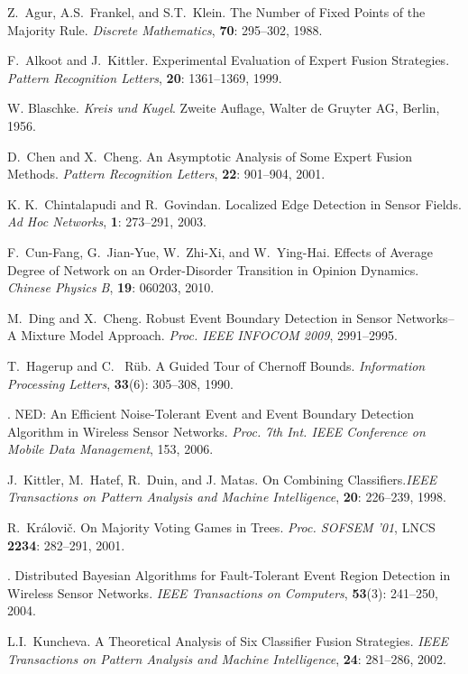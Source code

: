 \documentclass{article}
\begin{document}
\begin{thebibliography}{100}
 {Z.~Agur, A.S.~Frankel, and S.T.~Klein}.
{The Number of Fixed Points of the Majority Rule}.
{\em Discrete Mathematics}, {\bf 70}: 295--302, 1988.


 {F.~Alkoot and J.~Kittler}.
{Experimental Evaluation of Expert Fusion Strategies}.
{\em Pattern Recognition Letters}, {\bf 20}: 1361--1369, 1999.

 {W. Blaschke}.
{\em Kreis und Kugel}.
{Zweite Auflage, Walter de Gruyter AG, Berlin}, 1956.

 {D.~Chen and X.~Cheng}.
{An Asymptotic Analysis of Some Expert Fusion Methods}.
{\em Pattern Recognition Letters}, {\bf 22}: 901--904, 2001.

 {K. K.~Chintalapudi and R.~Govindan}. {Localized Edge Detection
in Sensor Fields}.  {\em Ad Hoc Networks}, {\bf 1}: 273--291, 2003.

 {F.~Cun-Fang, G.~Jian-Yue, W.~Zhi-Xi, and W.~Ying-Hai}.
{Effects of Average Degree of Network on an Order-Disorder Transition in
Opinion Dynamics}. {\em Chinese Physics B}, {\bf 19}: 060203, 2010.

 {M.~Ding and X.~Cheng}. {Robust Event Boundary Detection
in Sensor Networks--A Mixture Model Approach}. {\em Proc. IEEE INFOCOM 2009},
2991--2995.

 {T.~Hagerup and C.~ R\"ub}.
{A Guided Tour of Chernoff Bounds}. {\em Information Processing Letters},
{\bf 33}(6): 305--308, 1990.

.
{NED: An Efficient Noise-Tolerant Event and Event  Boundary Detection
Algorithm in Wireless Sensor Networks}.
{\em  Proc. 7th Int. IEEE Conference on Mobile Data Management}, 153, 2006.

 {J.~Kittler, M.~Hatef, R.~Duin, and J. Matas}.
{On Combining Classifiers}.{\em IEEE Transactions on
Pattern Analysis and Machine Intelligence}, {\bf 20}: 226--239, 1998.

 {R.~Kr\'alovi\v{c}}. {On Majority Voting Games in Trees}.
{\em Proc. SOFSEM '01}, LNCS {\bf 2234}: 282--291, 2001.

.
{Distributed Bayesian Algorithms for Fault-Tolerant Event Region Detection
in Wireless Sensor Networks}. {\em IEEE Transactions on Computers},
{\bf 53}(3): 241--250, 2004.


 {L.I.~Kuncheva}.
{A Theoretical Analysis of Six Classifier Fusion Strategies}.
{\em IEEE Transactions on Pattern Analysis and Machine Intelligence},
{\bf 24}: 281--286, 2002.


\end{thebibliography}
\end{document}
